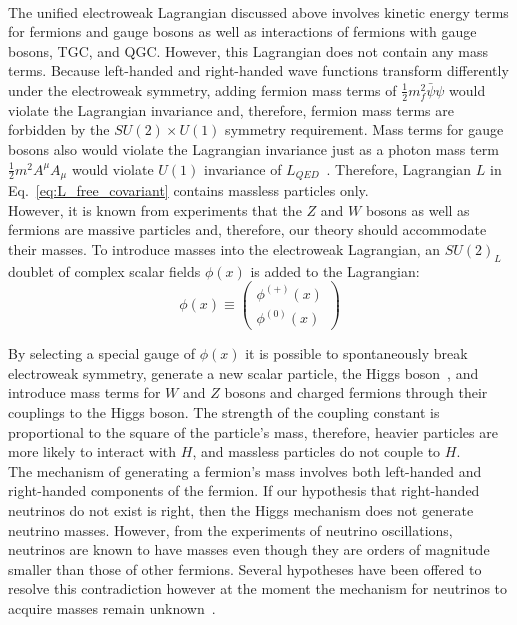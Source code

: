 \\

The unified electroweak Lagrangian discussed above involves kinetic energy terms for fermions and gauge bosons as well as interactions of fermions with gauge bosons, TGC, and QGC. However, this Lagrangian does not contain any mass terms. Because left-handed and right-handed wave functions transform differently under the electroweak symmetry, adding fermion mass terms of $\frac{1}{2} m_f^2 \bar{\psi} \psi$ would violate the Lagrangian invariance and, therefore, fermion mass terms are forbidden by the $SU(2) \times U(1)$ symmetry requirement. Mass terms for gauge bosons also would violate the Lagrangian invariance just as a photon mass term $\frac{1}{2} m^2 A^\mu A_\mu$ would violate $U(1)$ invariance of $L_{QED}$~\cite{ref_Griffiths}. Therefore, Lagrangian $L$ in Eq.~\ref{eq:L_free_covariant} contains massless particles only.\\

However, it is known from experiments that the $Z$ and $W$ bosons as well as fermions are massive particles and, therefore, our theory should accommodate their masses. To introduce masses into the electroweak Lagrangian, an $SU(2)_L$ doublet of complex scalar fields $\phi(x)$ is added to the Lagrangian:\\

\begin{equation}\label{eq:H_doublet}
  \phi(x) \equiv \begin{pmatrix} \phi^{(+)}(x) \\ \phi^{(0)}(x) \end{pmatrix}
\end{equation}

By selecting a special gauge of $\phi(x)$ it is possible to spontaneously break electroweak symmetry, generate a new scalar particle, the Higgs boson~\cite{ref_Pich}, and introduce mass terms for $W$ and $Z$ bosons and charged fermions through their couplings to the Higgs boson. The strength of the coupling constant is proportional to the square of the particle's mass, therefore, heavier particles are more likely to interact with $H$, and massless particles do not couple to $H$.\\

The mechanism of generating a fermion's mass involves both left-handed and right-handed components of the fermion. If our hypothesis that right-handed neutrinos do not exist is right, then the Higgs mechanism does not generate neutrino masses. However, from the experiments of neutrino oscillations, neutrinos are known to have masses even though they are orders of magnitude smaller than those of other fermions. Several hypotheses have been offered to resolve this contradiction however at the moment the mechanism for neutrinos to acquire masses remain unknown~\cite{ref_PDG}.\\

